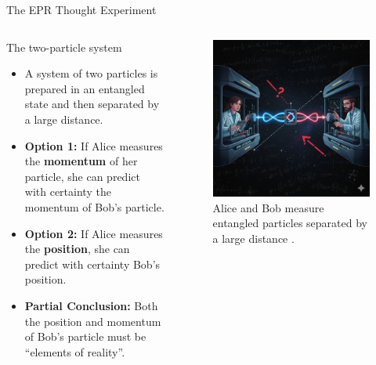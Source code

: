 \begin{frame}{The EPR Thought Experiment}

  \begin{columns}[T] %
    \begin{column}{0.6\textwidth}
      \begin{block}{The two-particle system}
        \begin{itemize}[<+->]
          \item A system of two particles is prepared in an entangled state and then separated by a large distance.
          \item \textbf{Option 1:} If Alice measures the \textbf{momentum} of her particle, she can predict with certainty the momentum of Bob's particle.
          \item \textbf{Option 2:} If Alice measures the \textbf{position}, she can predict with certainty Bob's position.
          \item \textbf{Partial Conclusion:} Both the position and momentum of Bob's particle must be ``elements of reality''.
        \end{itemize}
      \end{block}
    \end{column}

    \begin{column}{0.4\textwidth}
      \begin{figure}
        \centering
        \includegraphics[width=\linewidth]{images/epr_experiment.png}
        \caption{Alice and Bob measure entangled particles separated by a large distance \cite{googlo_ilustracion_2025}.}
      \end{figure}
    \end{column}
  \end{columns}

\end{frame}

